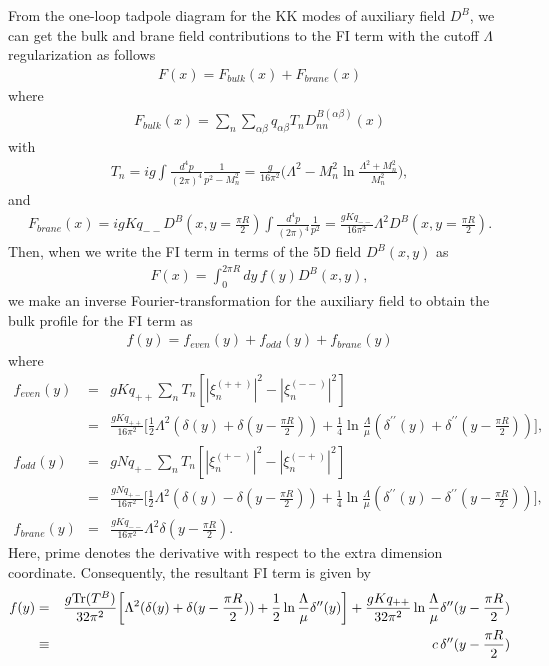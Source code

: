 \documentclass[a4paper,12pt]{article}
\begin{document}
From the one-loop tadpole diagram for the KK modes of auxiliary field $D^B$,
we can get the bulk and brane field contributions to the FI term
with the cutoff $\Lambda$ regularization as follows
\begin{eqnarray}
F(x)=F_{bulk}(x)+F_{brane}(x)
\end{eqnarray}
where
\begin{eqnarray}
F_{bulk}(x)=\sum_n \sum_{\alpha\beta}q_{\alpha\beta}T_n
D^{B(\alpha\beta)}_{nn}(x)
\end{eqnarray}
with
\begin{eqnarray}
T_n=ig\int\frac{d^4p}{(2\pi)^4}\frac{1}{p^2-M^2_n}
=\frac{g}{16\pi^2}\bigg(\Lambda^2-M^2_n\ln\frac{\Lambda^2+M^2_n}{M^2_n}\bigg),
\end{eqnarray}
and
\begin{eqnarray}
F_{brane}(x)=igKq_{--}D^B(x,y=\frac{\pi R}{2})\int\frac{d^4p}{(2\pi)^4}
\frac{1}{p^2}=\frac{gKq_{--}}{16\pi^2}\Lambda^2 D^B(x,y=\frac{\pi R}{2}).
\end{eqnarray}
Then, when we write the FI term in terms of the 5D field $D^B(x,y)$ as
\begin{eqnarray}
F(x)=\int^{2\pi R}_0dy\,f(y)D^B(x,y),
\end{eqnarray}
we make an inverse Fourier-transformation for the auxiliary field to
obtain the bulk profile for the FI term as
\begin{eqnarray}
f(y)=f_{even}(y)+f_{odd}(y)+f_{brane}(y)
\end{eqnarray}
where
\begin{eqnarray}
f_{even}(y)&=&gKq_{++}\sum_n T_n [|\xi^{(++)}_n|^2-|\xi^{(--)}_n|^2]\nonumber
\\
&=&\frac{gKq_{++}}{16\pi^2}\bigg[\frac{1}{2}\Lambda^2(\delta(y)
+\delta(y-\frac{\pi R}{2}))
+\frac{1}{4}\ln\frac{\Lambda}{\mu}(\delta^{\prime\prime}(y)
+\delta^{\prime\prime}(y-\frac{\pi R}{2}))\bigg],\\
f_{odd}(y)&=&gNq_{+-}\sum_n T_n [|\xi^{(+-)}_n|^2-|\xi^{(-+)}_n|^2]\nonumber
\\
&=&\frac{gNq_{+-}}{16\pi^2}\bigg[\frac{1}{2}\Lambda^2(\delta(y)
-\delta(y-\frac{\pi R}{2}))
+\frac{1}{4}\ln\frac{\Lambda}{\mu}(\delta^{\prime\prime}(y)
-\delta^{\prime\prime}(y-\frac{\pi R}{2}))\bigg], \\
f_{brane}(y)&=&\frac{gKq_{--}}{16\pi^2}\Lambda^2\delta(y-\frac{\pi R}{2}).
\end{eqnarray}
Here, prime denotes the derivative
with respect to the extra dimension coordinate. Consequently, the resultant
FI term is given by
\begin{eqnarray}
f(y)&=&\frac{g{\rm Tr}(T^B)}{32\pi^2}\bigg[\Lambda^2(\delta(y)
+\delta(y-\frac{\pi R}{2}))+\frac{1}{2}\ln\frac{\Lambda}{\mu}
\delta^{\prime\prime}(y)\bigg]+\frac{gKq_{++}}{32\pi^2}
\ln\frac{\Lambda}{\mu}\delta^{\prime\prime}(y-\frac{\pi R}{2}) \nonumber \\
&\equiv&c\,\delta^{\prime\prime}(y-\frac{\pi R}{2})
\end{eqnarray}
\end{document}
